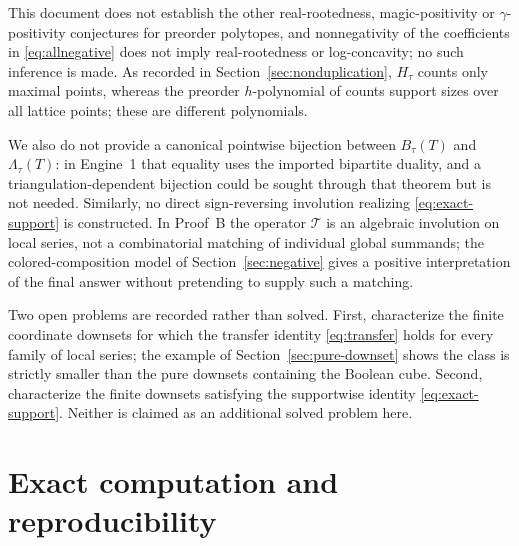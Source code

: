 \documentclass[11pt]{article}
\numberwithin{equation}{section}
\theoremstyle{definition}
\theoremstyle{remark}
\newcommand{\Tr}{\mathcal T}
\begin{document}
This document does not establish the other real-rootedness,
magic-positivity or $\gamma$-positivity conjectures for preorder polytopes,
and nonnegativity of the coefficients in \eqref{eq:allnegative} does not imply
real-rootedness or log-concavity; no such inference is made. As recorded in
Section~\ref{sec:nonduplication}, $H_\tau$ counts only maximal points, whereas
the preorder $h$-polynomial of \cite[Section~5]{AC} counts support sizes over
all lattice points; these are different polynomials.

We also do not provide a canonical pointwise bijection between $B_\tau(T)$ and
$\Lambda_\tau(T)$: in Engine~1 that equality uses the imported bipartite
duality, and a triangulation-dependent bijection could be sought through that
theorem but is not needed. Similarly, no direct sign-reversing involution
realizing \eqref{eq:exact-support} is constructed. In Proof~B the operator
$\Tr$ is an algebraic involution on local series, not a combinatorial matching
of individual global summands; the colored-composition model of
Section~\ref{sec:negative} gives a positive interpretation of the final answer
without pretending to supply such a matching.

Two open problems are recorded rather than solved. First, characterize the
finite coordinate downsets for which the transfer identity
\eqref{eq:transfer} holds for every family of local series; the example of
Section~\ref{sec:pure-downset} shows the class is strictly smaller than the
pure downsets containing the Boolean cube. Second, characterize the finite
downsets satisfying the supportwise identity \eqref{eq:exact-support}. Neither
is claimed as an additional solved problem here.

\section{Exact computation and reproducibility}
\label{sec:computation}
\end{document}
